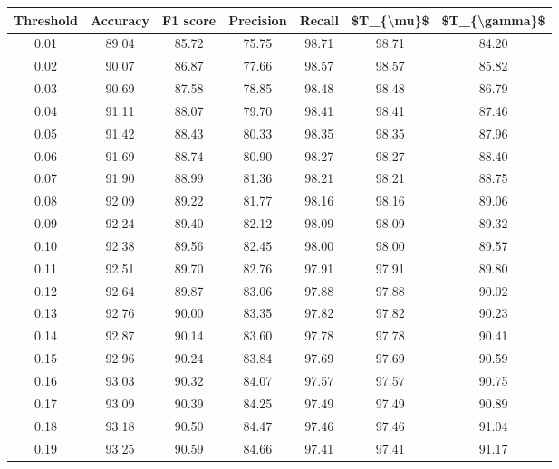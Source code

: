\begin{tabular}{|c|c|c|c|c|c|c|}
\hline
 Threshold &  Accuracy &  F1 score &  Precision &  Recall &  \$T\_\{\textbackslash mu\}\$ &  \$T\_\{\textbackslash gamma\}\$ \\
\hline
      0.01 &     89.04 &     85.72 &      75.75 &   98.71 &      98.71 &         84.20 \\
      0.02 &     90.07 &     86.87 &      77.66 &   98.57 &      98.57 &         85.82 \\
      0.03 &     90.69 &     87.58 &      78.85 &   98.48 &      98.48 &         86.79 \\
      0.04 &     91.11 &     88.07 &      79.70 &   98.41 &      98.41 &         87.46 \\
      0.05 &     91.42 &     88.43 &      80.33 &   98.35 &      98.35 &         87.96 \\
      0.06 &     91.69 &     88.74 &      80.90 &   98.27 &      98.27 &         88.40 \\
      0.07 &     91.90 &     88.99 &      81.36 &   98.21 &      98.21 &         88.75 \\
      0.08 &     92.09 &     89.22 &      81.77 &   98.16 &      98.16 &         89.06 \\
      0.09 &     92.24 &     89.40 &      82.12 &   98.09 &      98.09 &         89.32 \\
      0.10 &     92.38 &     89.56 &      82.45 &   98.00 &      98.00 &         89.57 \\
      0.11 &     92.51 &     89.70 &      82.76 &   97.91 &      97.91 &         89.80 \\
      0.12 &     92.64 &     89.87 &      83.06 &   97.88 &      97.88 &         90.02 \\
      0.13 &     92.76 &     90.00 &      83.35 &   97.82 &      97.82 &         90.23 \\
      0.14 &     92.87 &     90.14 &      83.60 &   97.78 &      97.78 &         90.41 \\
      0.15 &     92.96 &     90.24 &      83.84 &   97.69 &      97.69 &         90.59 \\
      0.16 &     93.03 &     90.32 &      84.07 &   97.57 &      97.57 &         90.75 \\
      0.17 &     93.09 &     90.39 &      84.25 &   97.49 &      97.49 &         90.89 \\
      0.18 &     93.18 &     90.50 &      84.47 &   97.46 &      97.46 &         91.04 \\
      0.19 &     93.25 &     90.59 &      84.66 &   97.41 &      97.41 &         91.17 \\

\end{tabular}
